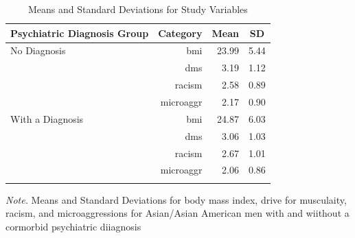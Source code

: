 \documentclass[
  english,
  man, fleqn, noextraspace,floatsintext]{apa6}
\begin{document}
\begin{table}[tbp]

\begin{center}
\begin{threeparttable}

\caption{\label{tab:table1}Means and Standard Deviations for Study Variables}

\begin{tabular}{lrrr}
\toprule
Psychiatric Diagnosis Group & \multicolumn{1}{c}{Category} & \multicolumn{1}{c}{Mean} & \multicolumn{1}{c}{SD}\\
\midrule
No Diagnosis & bmi & 23.99 & 5.44\\
 & dms & 3.19 & 1.12\\
 & racism & 2.58 & 0.89\\
 & microaggr & 2.17 & 0.90\\
With a Diagnosis & bmi & 24.87 & 6.03\\
 & dms & 3.06 & 1.03\\
 & racism & 2.67 & 1.01\\
 & microaggr & 2.06 & 0.86\\
\bottomrule
\addlinespace
\end{tabular}

\begin{tablenotes}[para]
\normalsize{\textit{Note.}  Means and Standard Deviations for body mass index, drive for musculaity, racism, and microaggressions for Asian/Asian American men with and wiithout a cormorbid psychiatric diiagnosis}
\end{tablenotes}

\end{threeparttable}
\end{center}

\end{table}
\end{document}
